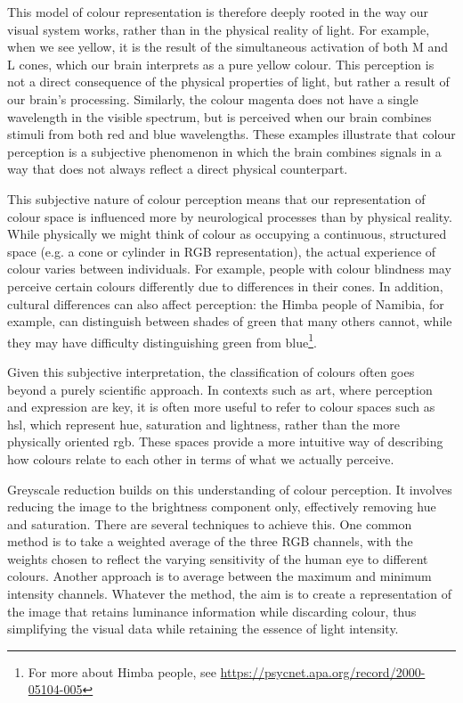 \noindent This model of colour representation is therefore deeply rooted in the way our visual system works, rather than in the physical reality of light. For example, when we see yellow, it is the result of the simultaneous activation of both M and L cones, which our brain interprets as a pure yellow colour. This perception is not a direct consequence of the physical properties of light, but rather a result of our brain's processing. Similarly, the colour magenta does not have a single wavelength in the visible spectrum, but is perceived when our brain combines stimuli from both red and blue wavelengths. These examples illustrate that colour perception is a subjective phenomenon in which the brain combines signals in a way that does not always reflect a direct physical counterpart.

\noindent This subjective nature of colour perception means that our representation of colour space is influenced more by neurological processes than by physical reality. While physically we might think of colour as occupying a continuous, structured space (e.g. a cone or cylinder in RGB representation), the actual experience of colour varies between individuals. For example, people with colour blindness may perceive certain colours differently due to differences in their cones. In addition, cultural differences can also affect perception: the Himba people of Namibia, for example, can distinguish between shades of green that many others cannot, while they may have difficulty distinguishing green from blue\footnote{For more about Himba people, see \url{https://psycnet.apa.org/record/2000-05104-005}}.

\noindent Given this subjective interpretation, the classification of colours often goes beyond a purely scientific approach. In contexts such as art, where perception and expression are key, it is often more useful to refer to colour spaces such as \gls{hsl}, which represent hue, saturation and lightness, rather than the more physically oriented \gls{rgb}. These spaces provide a more intuitive way of describing how colours relate to each other in terms of what we actually perceive.

\noindent Greyscale reduction builds on this understanding of colour perception. It involves reducing the image to the brightness component only, effectively removing hue and saturation. There are several techniques to achieve this. One common method is to take a weighted average of the three RGB channels, with the weights chosen to reflect the varying sensitivity of the human eye to different colours. Another approach is to average between the maximum and minimum intensity channels. Whatever the method, the aim is to create a representation of the image that retains luminance information while discarding colour, thus simplifying the visual data while retaining the essence of light intensity.

